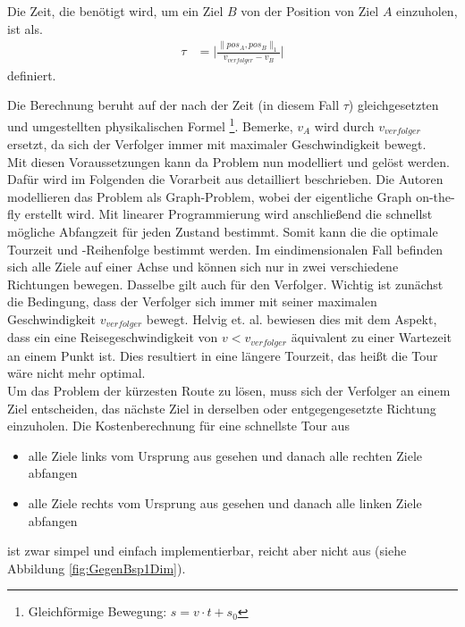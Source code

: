 \documentclass[german,version-2019-11]{uzl-thesis}
\begin{document}
\begin{definition}
\label{def:WegZeit}
Die Zeit, die benötigt wird, um ein Ziel $B$ von der Position von Ziel $A$ einzuholen, ist als. 
\begin{align*}
\tau &= \bigg\vert\frac{\|pos_A,pos_B\|_1}{v_{verfolger}-v_B}\bigg\vert
\end{align*} 
definiert.
\end{definition}\noindent
Die Berechnung beruht auf der nach der Zeit (in diesem Fall $\tau$) gleichgesetzten und umgestellten physikalischen Formel \footnote{Gleichförmige Bewegung: $s=v\cdot t+s_0$}.
Bemerke, $v_A$ wird durch $v_{verfolger}$ ersetzt, da sich der Verfolger immer mit maximaler Geschwindigkeit bewegt.\\
Mit diesen Voraussetzungen kann da Problem nun modelliert und gelöst werden. Dafür wird im Folgenden die Vorarbeit aus \cite{helvig} detailliert beschrieben. Die Autoren modellieren das Problem als Graph-Problem, wobei der eigentliche Graph on-the-fly erstellt wird. Mit linearer Programmierung wird anschließend die schnellst mögliche Abfangzeit für jeden Zustand bestimmt. Somit kann die die optimale Tourzeit und -Reihenfolge bestimmt werden.
Im eindimensionalen Fall befinden sich alle Ziele auf einer Achse und können sich nur in zwei verschiedene Richtungen bewegen. Dasselbe gilt auch für den Verfolger. Wichtig ist zunächst die Bedingung, dass der Verfolger sich immer mit seiner maximalen Geschwindigkeit $v_{verfolger}$ bewegt. Helvig et. al. bewiesen dies mit dem Aspekt, dass ein eine Reisegeschwindigkeit von $v<v_{verfolger}$ äquivalent zu einer Wartezeit an einem Punkt ist. Dies resultiert in eine längere Tourzeit, das heißt die Tour wäre nicht mehr optimal.\\
Um das Problem der kürzesten Route zu lösen, muss sich der Verfolger an einem Ziel entscheiden, das nächste Ziel in derselben oder entgegengesetzte Richtung einzuholen. Die Kostenberechnung für eine schnellste Tour aus
\begin{itemize}
\item alle Ziele links vom Ursprung aus gesehen und danach alle rechten Ziele abfangen
\item alle Ziele rechts vom Ursprung aus gesehen und danach alle linken Ziele abfangen
\end{itemize} 
ist zwar simpel und einfach implementierbar, reicht aber nicht aus (siehe Abbildung \ref{fig:GegenBsp1Dim}).
\end{document}
